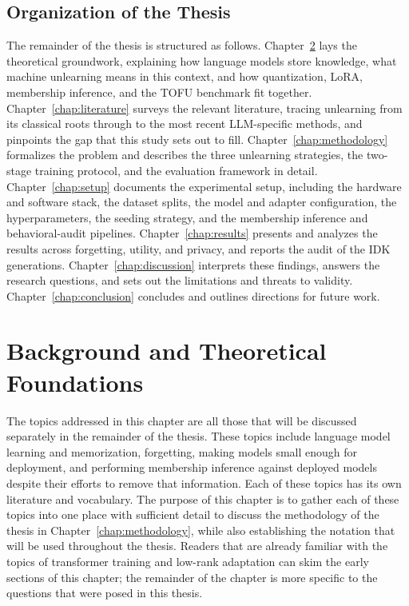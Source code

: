 \documentclass[a4paper,12pt]{report}
\begin{document}
\section{Organization of the Thesis}
The remainder of the thesis is structured as follows. Chapter~\ref{chap:background} lays the theoretical groundwork, explaining how language models store knowledge, what machine unlearning means in this context, and how quantization, LoRA, membership inference, and the TOFU benchmark fit together. Chapter~\ref{chap:literature} surveys the relevant literature, tracing unlearning from its classical roots through to the most recent LLM-specific methods, and pinpoints the gap that this study sets out to fill. Chapter~\ref{chap:methodology} formalizes the problem and describes the three unlearning strategies, the two-stage training protocol, and the evaluation framework in detail. Chapter~\ref{chap:setup} documents the experimental setup, including the hardware and software stack, the dataset splits, the model and adapter configuration, the hyperparameters, the seeding strategy, and the membership inference and behavioral-audit pipelines. Chapter~\ref{chap:results} presents and analyzes the results across forgetting, utility, and privacy, and reports the audit of the IDK generations. Chapter~\ref{chap:discussion} interprets these findings, answers the research questions, and sets out the limitations and threats to validity. Chapter~\ref{chap:conclusion} concludes and outlines directions for future work.

\chapter{Background and Theoretical Foundations}
\label{chap:background}
The topics addressed in this chapter are all those that will be discussed separately in the remainder of the thesis. These topics include language model learning and memorization, forgetting, making models small enough for deployment, and performing membership inference against deployed models despite their efforts to remove that information. Each of these topics has its own literature and vocabulary. The purpose of this chapter is to gather each of these topics into one place with sufficient detail to discuss the methodology of the thesis in Chapter~\ref{chap:methodology}, while also establishing the notation that will be used throughout the thesis. Readers that are already familiar with the topics of transformer training and low-rank adaptation can skim the early sections of this chapter; the remainder of the chapter is more specific to the questions that were posed in this thesis.
\end{document}
